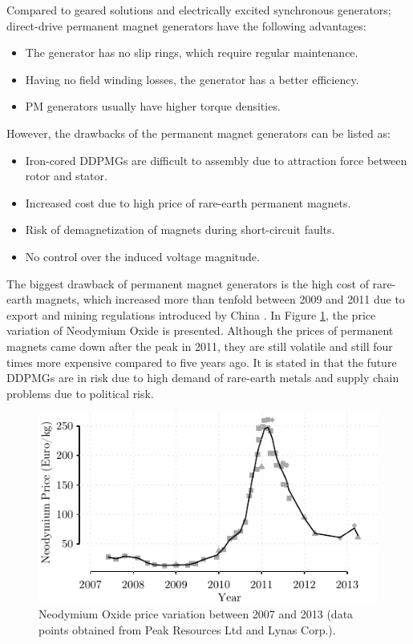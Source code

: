 \documentclass[a4paper, 11pt]{article} %
\begin{document}
Compared to geared solutions and electrically excited synchronous generators; direct-drive permanent magnet generators have the following advantages:

\begin{itemize}
	\item The generator has no slip rings, which require regular maintenance.
	\item Having no field winding losses, the generator has a better efficiency.
	\item PM generators usually have higher torque densities.
\end{itemize}

However, the drawbacks of the permanent magnet generators can be listed as:

\begin{itemize}
	\item Iron-cored DDPMGs are difficult to assembly due to attraction force between rotor and stator.
	\item Increased cost due to high price of rare-earth permanent magnets.
	\item Risk of demagnetization of magnets during short-circuit faults.
	\item No control over the induced voltage magnitude.
\end{itemize}

The biggest drawback of permanent magnet generators is the high cost of rare-earth magnets, which increased more than tenfold between 2009 and 2011 due to export and mining regulations introduced by China  \cite{rareearthelements}. In Figure \ref{neodymium_price}, the price variation of Neodymium Oxide is presented. Although the prices of permanent magnets came down after the peak in 2011, they are still volatile and still four times more expensive compared to five years ago. It is stated in \cite{Moss2011} that the future DDPMGs are in risk due to high demand of rare-earth metals  and supply chain problems due to political risk.  

\begin{figure}[]
\centering
\includegraphics[]{neodymium_price}
\caption{Neodymium Oxide price variation between 2007 and 2013 (data points obtained from Peak Resources Ltd and Lynas Corp.).}
\label{neodymium_price}
\end{figure}
\end{document}
